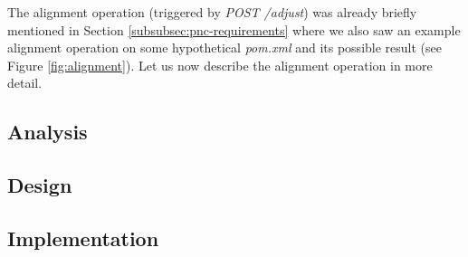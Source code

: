 \documentclass[../main.tex]{subfiles}
\begin{document}
The alignment operation (triggered by \textit{POST /adjust}) was already briefly mentioned in Section \ref{subsubsec:pnc-requirements} where we also saw an example alignment operation on some hypothetical \textit{pom.xml} and its possible result (see Figure \ref{fig:alignment}). Let us now describe the alignment operation in more detail.

\subsection{Analysis}


\subsection{Design}


\subsection{Implementation}

\end{document}
